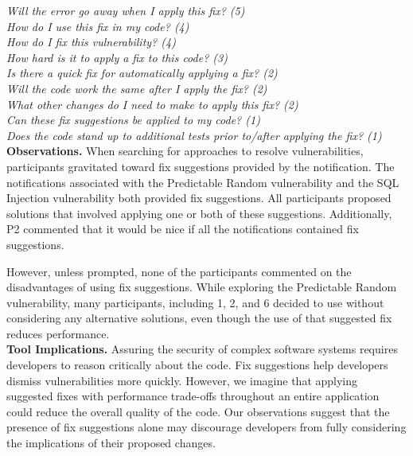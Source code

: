 \documentclass[conference]{IEEEtran}
\begin{document}
\noindent\emph{Will the error go away when I apply this fix? (5)} \\
\emph{How do I use this fix in my code? (4)} \\
\emph{How do I fix this vulnerability? (4)} \\
\emph{How hard is it to apply a fix to this code? (3)} \\
\emph{Is there a quick fix for automatically applying a fix? (2)} \\
\emph{Will the code work the same after I apply the fix? (2)} \\
\emph{What other changes do I need to make to apply this fix? (2)} \\
\emph{Can these fix suggestions be applied to my code? (1)} \\
\emph{Does the code stand up to additional tests prior to/after applying the fix? (1)} \\


\noindent\textbf{Observations.}
When searching for approaches to resolve vulnerabilities, participants gravitated toward fix suggestions provided by the notification.
The notifications associated with the Predictable Random vulnerability and the SQL Injection vulnerability both provided fix suggestions.
All participants proposed solutions that involved applying one or both of these suggestions. 
Additionally, P2 commented that it would be nice if all the notifications contained fix suggestions.

However, unless prompted, none of the participants commented on the disadvantages of using fix suggestions.
While exploring the Predictable Random vulnerability, many participants, including 1, 2, and 6 decided to use  without considering any alternative solutions, even though the use of that suggested fix reduces performance.
\\


\noindent\textbf{Tool Implications.}
Assuring the security of complex software systems requires developers to reason critically about the code. 
Fix suggestions help developers dismiss vulnerabilities more quickly.
However, we imagine that applying suggested fixes with performance trade-offs throughout an entire application could reduce the overall quality of the code.
Our observations suggest that the presence of fix suggestions alone may discourage developers from fully considering the implications of their proposed changes.
\end{document}
